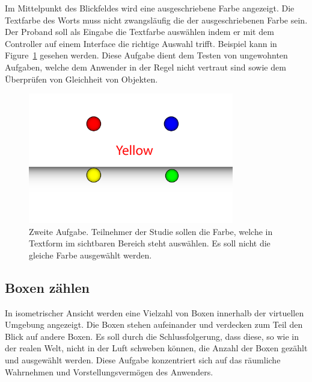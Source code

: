 Im Mittelpunkt des Blickfeldes wird eine ausgeschriebene Farbe angezeigt. Die Textfarbe des Worts muss nicht zwangsläufig die der ausgeschriebenen Farbe sein. 
Der Proband soll als Eingabe die Textfarbe auswählen indem er mit dem Controller auf einem Interface die richtige Auswahl trifft. Beispiel kann in Figure~\ref{fig:matching_abstract} gesehen werden. 
Diese Aufgabe dient dem Testen von ungewohnten Aufgaben, welche dem Anwender in der Regel nicht vertraut sind sowie dem Überprüfen von Gleichheit von Objekten.

\begin{figure}[H]
	\centering
	\includegraphics[width=0.8\textwidth]{./images/matching_abstract.png}
	\caption{Zweite Aufgabe. Teilnehmer der Studie sollen die Farbe, welche in Textform im sichtbaren Bereich steht auswählen. Es soll nicht die gleiche Farbe ausgewählt werden.}
	\label{fig:matching_abstract}
\end{figure}

\subsection{Boxen zählen} 

In isometrischer Ansicht werden eine Vielzahl von Boxen innerhalb der virtuellen Umgebung angezeigt. 
Die Boxen stehen aufeinander und verdecken zum Teil den Blick auf andere Boxen. Es soll durch die Schlussfolgerung, dass diese, so wie in der realen Welt, nicht in der Luft schweben können, die Anzahl der Boxen gezählt und ausgewählt werden. 
Diese Aufgabe konzentriert sich auf das räumliche Wahrnehmen und Vorstellungsvermögen des Anwenders.

